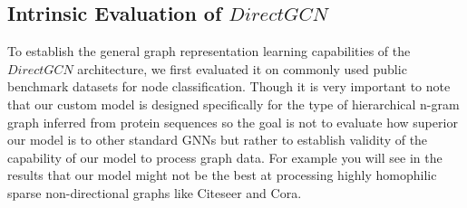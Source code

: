 \documentclass[utf8]{article}
\begin{document}
	\subsection{Intrinsic Evaluation of $DirectGCN$}
	To establish the general graph representation learning capabilities of the  $DirectGCN$ architecture, we first evaluated it on commonly used public benchmark datasets for node classification. Though it  is very important to note that our custom model is designed specifically for the type of hierarchical n-gram graph inferred from protein sequences so the goal is not to evaluate how superior our model is to other standard GNNs but rather to establish validity of the capability of our model to process graph data. For example you will see in the results that our model might not be the best at processing highly homophilic sparse non-directional graphs like Citeseer and Cora.
	
\end{document}
